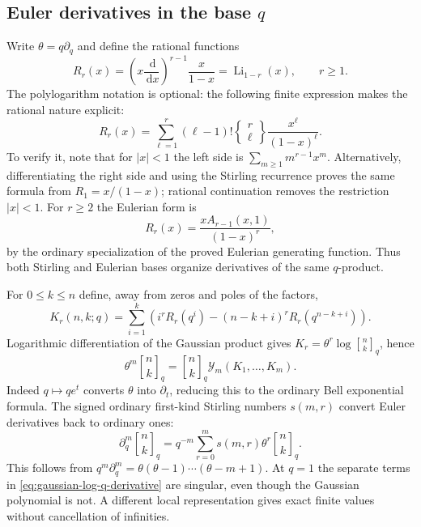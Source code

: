 \documentclass[11pt,a4paper]{article}
\numberwithin{equation}{section}
\theoremstyle{definition}
\theoremstyle{remark}
\newcommand{\G}[2]{\genfrac{[}{]}{0pt}{}{#1}{#2}_{q}}
\newcommand{\Li}{\operatorname{Li}}
\newcommand{\Sg}[2]{\left\{\begin{matrix}#1\\#2\end{matrix}\right\}}
\newcommand{\dd}{\,\mathrm d}
\newcommand{\Y}{\mathcal Y}
\begin{document}
\subsection{Euler derivatives in the base \texorpdfstring{$q$}{q}}
Write $\theta=q\partial_q$ and define the rational functions
\begin{equation}
 R_r(x)=\left(x\frac{\dd}{\dd x}\right)^{r-1}\frac{x}{1-x}
       =\Li_{1-r}(x),\qquad r\ge1.
 \label{eq:Rr}
\end{equation}
The polylogarithm notation is optional: the following finite expression
makes the rational nature explicit:
\begin{equation}
 R_r(x)=\sum_{\ell=1}^r
       (\ell-1)!\Sg r\ell\frac{x^\ell}{(1-x)^\ell}.
 \label{eq:Rr-stirling}
\end{equation}
To verify it, note that for $|x|<1$ the left side is
$\sum_{m\ge1}m^{r-1}x^m$. Alternatively, differentiating the right side
and using the Stirling recurrence proves the same formula from
$R_1=x/(1-x)$; rational continuation removes the restriction $|x|<1$.
For $r\ge2$ the Eulerian form is
\begin{equation}
 R_r(x)=\frac{xA_{r-1}(x,1)}{(1-x)^r},
 \label{eq:Rr-eulerian}
\end{equation}
by the ordinary specialization of the proved Eulerian generating
function. Thus both Stirling and Eulerian bases organize derivatives
of the same $q$-product.

For $0\le k\le n$ define, away from zeros and poles of the factors,
\begin{equation}
 K_r(n,k;q)=\sum_{i=1}^k
       \left(i^rR_r(q^i)-(n-k+i)^rR_r(q^{n-k+i})\right).
 \label{eq:gaussian-log-q-derivative}
\end{equation}
Logarithmic differentiation of the Gaussian product gives
$K_r=\theta^r\log\G nk$, hence
\begin{equation}
 \theta^m\G nk=\G nk\Y_m(K_1,\ldots,K_m).
 \label{eq:gaussian-q-derivative-bell}
\end{equation}
Indeed $q\mapsto qe^t$ converts $\theta$ into $\partial_t$, reducing
this to the ordinary Bell exponential formula. The signed ordinary
first-kind Stirling numbers $s(m,r)$ convert Euler derivatives back to
ordinary ones:
\begin{equation}
 \partial_q^m\G nk
   =q^{-m}\sum_{r=0}^m s(m,r)\theta^r\G nk.
 \label{eq:euler-to-ordinary}
\end{equation}
This follows from $q^m\partial_q^m=\theta(\theta-1)\cdots(\theta-m+1)$.
At $q=1$ the separate terms in \cref{eq:gaussian-log-q-derivative}
are singular, even though the Gaussian polynomial is not. A different
local representation gives exact finite values without cancellation of
infinities.
\end{document}
